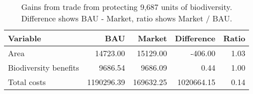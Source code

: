 \begin{table}

\caption{\label{tab:gains-from-trade}Gains from trade from protecting 9,687 units of biodiversity. Difference shows BAU - Market, ratio shows Market / BAU.}
\centering
\begin{tabular}[t]{l|r|r|r|r}
\hline
Variable & BAU & Market & Difference & Ratio\\
\hline
Area & 14723.00 & 15129.00 & -406.00 & 1.03\\
\hline
Biodiversity benefits & 9686.54 & 9686.09 & 0.44 & 1.00\\
\hline
Total costs & 1190296.39 & 169632.25 & 1020664.15 & 0.14\\
\hline
\end{tabular}
\end{table}